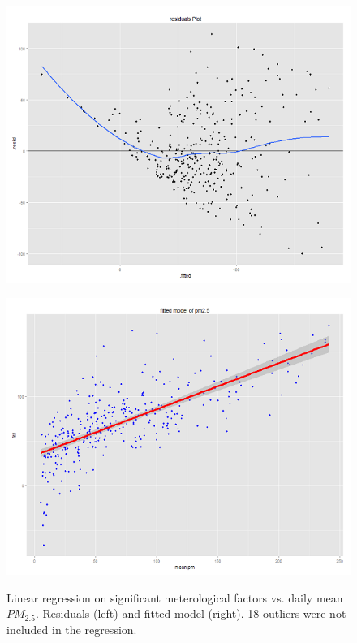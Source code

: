 \documentclass[11pt]{article} %
\begin{document}
\begin{figure}
\centering
\begin{minipage}{.5\textwidth}
  \centering
  \includegraphics[width=\linewidth]{Figure2-2}
  \label{fig:test1}
\end{minipage}%
\begin{minipage}{.5\textwidth}
  \centering
  \includegraphics[width=\linewidth]{Figure2-3}
  \label{fig:test2}
\end{minipage}
\caption{Linear regression on significant meterological factors vs. daily mean \(PM_{2.5}\). Residuals (left) and fitted model (right). 18 outliers were not included in the regression.}
\end{figure}
\end{document}
